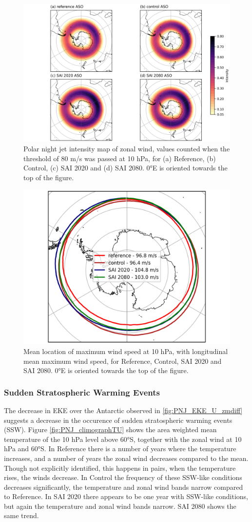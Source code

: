 \begin{figure}[H]
	\centering
	\includegraphics[width=0.95\linewidth]{images/PNJ_map.png}
	\caption{Polar night jet intensity map of zonal wind, values counted when the threshold of 80 m/s was passed at 10 hPa, for (a) Reference, (b) Control, (c) SAI 2020 and (d) SAI 2080. 0°E is oriented towards the top of the figure.}
	\label{fig:PNJ_map}
\end{figure}


\begin{figure}[H]
	\centering
	\includegraphics[width=0.48\linewidth]{images/PNJ_maxloc_latlon.png}
	\caption{Mean location of maximum wind speed at 10 hPa, with longitudinal mean maximum wind speed, for Reference, Control, SAI 2020 and SAI 2080. 0°E is oriented towards the top of the figure.}
	\label{fig:PNJ_maxloc}
\end{figure}

\subsubsection{Sudden Stratospheric Warming Events}
The decrease in EKE over the Antarctic observed in \ref{fig:PNJ_EKE_U_zmdiff} suggests a decrease in the occurence of sudden stratospheric warming events (SSW). Figure \ref{fig:PNJ_climographTU} shows the area weighted mean temperature of the 10 hPa level above 60°S, together with the zonal wind at 10 hPa and 60°S. In Reference there is a number of years where the temperature increases, and a number of years the zonal wind decreases compared to the mean. Though not explicitly identified, this happens in pairs, when the temperature rises, the winds decrease. In Control the frequency of these SSW-like conditions decreases significantly, the temperature and zonal wind bands narrow compared to Reference. In SAI 2020 there appears to be one year with SSW-like conditions, but again the temperature and zonal wind bands narrow. SAI 2080 shows the same trend. 

